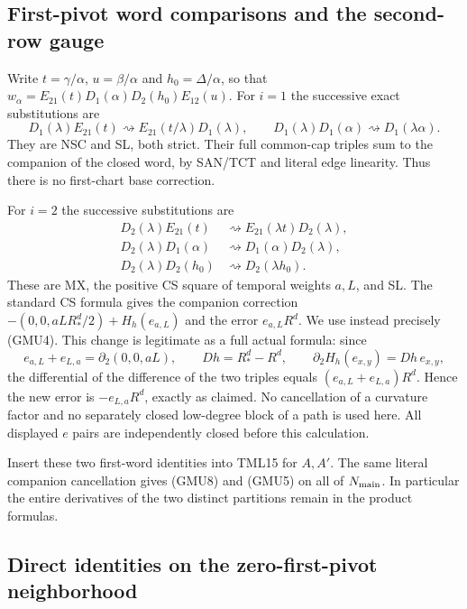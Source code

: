 \subsection{First-pivot word comparisons and the second-row gauge}

Write $t=\gamma/\alpha$, $u=\beta/\alpha$ and
$h_0=\Delta/\alpha$, so that
$w_\alpha=E_{21}(t)D_1(\alpha)D_2(h_0)E_{12}(u)$.
For $i=1$ the successive exact substitutions are
\[
 D_1(\lambda)E_{21}(t)
      \rightsquigarrow E_{21}(t/\lambda)D_1(\lambda),
 \qquad
 D_1(\lambda)D_1(\alpha)\rightsquigarrow D_1(\lambda\alpha).
 \tag{GMU10}
\]
They are NSC and SL, both strict.  Their full common-cap triples
sum to the companion of the closed word, by SAN/TCT and literal
edge linearity.  Thus there is no first-chart base correction.

For $i=2$ the successive substitutions are
\[
 \begin{split}
 D_2(\lambda)E_{21}(t)&\rightsquigarrow
                      E_{21}(\lambda t)D_2(\lambda),\\
 D_2(\lambda)D_1(\alpha)&\rightsquigarrow
                      D_1(\alpha)D_2(\lambda),\\
 D_2(\lambda)D_2(h_0)&\rightsquigarrow D_2(\lambda h_0).
 \end{split}
 \tag{GMU11}
\]
These are MX, the positive CS square of temporal weights $a,L$,
and SL.  The standard CS formula gives the companion correction
$-(0,0,aL R_*^d/2)+H_h(e_{a,L})$ and the error $e_{a,L}R^d$.
We use instead precisely (GMU4).  This change is legitimate as a
full actual formula: since
\[
 e_{a,L}+e_{L,a}=\partial_2(0,0,aL),\qquad
 Dh=R_*^d-R^d,\qquad
 \partial_2H_h(e_{x,y})=Dh\,e_{x,y},
\]
the differential of the difference of the two triples equals
$(e_{a,L}+e_{L,a})R^d$.  Hence the new error is
$-e_{L,a}R^d$, exactly as claimed.  No cancellation of a curvature
factor and no separately closed low-degree block of a path is
used here.  All displayed $e$ pairs are independently closed
before this calculation.

Insert these two first-word identities into TML15 for $A,A'$.
The same literal companion cancellation gives (GMU8) and (GMU5)
on all of $N_{\rm main}$.  In particular the entire derivatives
of the two distinct partitions remain in the product formulas.

\subsection{Direct identities on the zero-first-pivot neighborhood}

